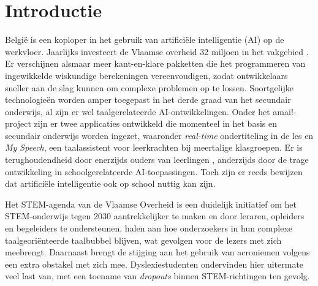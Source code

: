 
\section{Introductie}%
\label{sec:introductie}

België is een koploper in het gebruik van artificiële intelligentie (AI) op de werkvloer. Jaarlijks investeert de Vlaamse overheid 32 miljoen in het vakgebied \autocite{Crevits2022}. Er verschijnen alsmaar meer kant-en-klare pakketten die het programmeren van ingewikkelde wiskundige berekeningen vereenvoudigen, zodat ontwikkelaars sneller aan de slag kunnen om complexe problemen op te lossen. Soortgelijke technologieën worden amper toegepast in het derde graad van het secundair onderwijs, al zijn er wel taalgerelateerde AI-ontwikkelingen. Onder het amai!-project  zijn er twee applicaties ontwikkeld die momenteel in het basis en secundair onderwijs worden ingezet, waaronder \textit{real-time} ondertiteling in de les en \textit{My Speech}, een taalassistent voor leerkrachten bij meertalige klasgroepen.  Er is terughoudendheid door enerzijds ouders van leerlingen \autocite{Martens2021}, anderzijds door de trage ontwikkeling in schoolgerelateerde AI-toepassingen. Toch zijn er reeds bewijzen dat artificiële intelligentie ook op school nuttig kan zijn. 

Het STEM-agenda van de Vlaamse Overheid is een duidelijk initiatief om het STEM-onderwijs tegen 2030 aantrekkelijker te maken en door leraren, opleiders en begeleiders te ondersteunen. \textcite{PlavenSigray2017} halen aan hoe onderzoekers in hun complexe taalgeoriënteerde taalbubbel blijven, wat gevolgen voor de lezers met zich meebrengt. Daarnaast brengt de stijging aan het gebruik van acroniemen volgens \textcite{Barnett2020} een extra obstakel met zich mee. Dyslexiestudenten ondervinden hier uitermate veel last van, met een toename van \textit{dropouts} binnen STEM-richtingen ten gevolg. %


